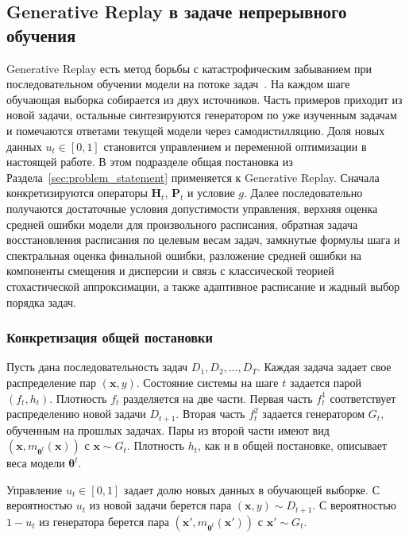 \documentclass[a4paper,14pt,oneside,openany]{extarticle}
\newcommand{\bH}{\mathbf{H}}
\newcommand{\bP}{\mathbf{P}}
\newcommand{\bx}{\mathbf{x}}
\newcommand{\btheta}{\boldsymbol{\theta}}
\begin{document}
\subsection{Generative Replay в задаче непрерывного обучения}\label{sec:gr}

Generative Replay есть метод борьбы с катастрофическим забыванием при последовательном обучении модели на потоке задач~\cite{shin2017continual}. На каждом шаге обучающая выборка собирается из двух источников. Часть примеров приходит из новой задачи, остальные синтезируются генератором по уже изученным задачам и помечаются ответами текущей модели через самодистилляцию. Доля новых данных $u_t \in [0, 1]$ становится управлением и переменной оптимизации в настоящей работе. В этом подразделе общая постановка из Раздела~\ref{sec:problem_statement} применяется к Generative Replay. Сначала конкретизируются операторы $\bH_t$, $\bP_t$ и условие $g$. Далее последовательно получаются достаточные условия допустимости управления, верхняя оценка средней ошибки модели для произвольного расписания, обратная задача восстановления расписания по целевым весам задач, замкнутые формулы шага и спектральная оценка финальной ошибки, разложение средней ошибки на компоненты смещения и дисперсии и связь с классической теорией стохастической аппроксимации, а также адаптивное расписание и жадный выбор порядка задач.

\subsubsection{Конкретизация общей постановки}

Пусть дана последовательность задач $D_1, D_2, \ldots, D_T$. Каждая задача задает свое распределение пар $(\bx, y)$. Состояние системы на шаге $t$ задается парой $(f_t, h_t)$. Плотность $f_t$ разделяется на две части. Первая часть $f_t^1$ соответствует распределению новой задачи $D_{t+1}$. Вторая часть $f_t^2$ задается генератором $G_t$, обученным на прошлых задачах. Пары из второй части имеют вид $(\bx, m_{\btheta^t}(\bx))$ с $\bx \sim G_t$. Плотность $h_t$, как и в общей постановке, описывает веса модели $\btheta^t$.

Управление $u_t \in [0, 1]$ задает долю новых данных в обучающей выборке. С вероятностью $u_t$ из новой задачи берется пара $(\bx, y) \sim D_{t+1}$. С вероятностью $1 - u_t$ из генератора берется пара $(\bx', m_{\btheta^t}(\bx'))$ с $\bx' \sim G_t$.
\end{document}
